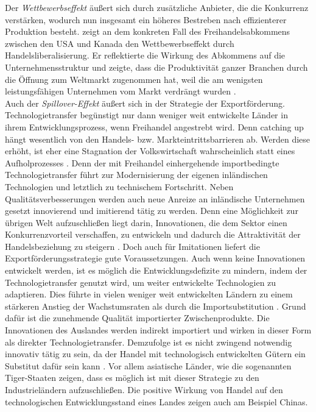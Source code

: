 Der \textit{Wettbewerbseffekt} {\"a}u{\ss}ert sich durch zus{\"a}tzliche Anbieter, die die Konkurrenz verst{\"a}rken, wodurch nun insgesamt ein h{\"o}heres Bestreben nach effizienterer Produktion besteht. \citet{Trefler.2004} zeigt an dem konkreten Fall des Freihandelsabkommens zwischen den USA und Kanada den Wettbewerbseffekt durch Handelsliberalisierung. Er reflektierte die Wirkung des Abkommens auf die Unternehmensstruktur und zeigte, dass die Produktivit{\"a}t ganzer Branchen durch die {\"O}ffnung zum Weltmarkt zugenommen hat, weil die am wenigsten leistungsf{\"a}higen Unternehmen vom Markt verdr{\"a}ngt wurden \cite{Trefler.2004}.\\


Auch der \textit{Spillover-Effekt} {\"a}u{\ss}ert sich in der Strategie der Exportf{\"o}rderung.  Technologietransfer beg{\"u}nstigt nur dann weniger weit entwickelte L{\"a}nder in ihrem Entwicklungsprozess, wenn Freihandel angestrebt wird. Denn catching up h{\"a}ngt wesentlich von den Handels- bzw. Markteintrittsbarrieren ab. Werden diese erh{\"o}ht, ist eher eine Stagnation der Volkswirtschaft wahrscheinlich statt eines Aufholprozesses \cite{Stokey.2015}. Denn der mit Freihandel einhergehende importbedingte Technologietransfer f{\"u}hrt zur Modernisierung der eigenen inl{\"a}ndischen Technologien und letztlich zu technischem Fortschritt.
Neben Qualit{\"a}tsverbesserungen werden auch neue Anreize  an inl{\"a}ndische Unternehmen gesetzt innovierend und imitierend t{\"a}tig zu werden. Denn eine M{\"o}glichkeit zur {\"u}brigen Welt aufzuschlie{\ss}en liegt darin, Innovationen, die dem Sektor einen Konkurrenzvorteil verschaffen, zu entwickeln und dadurch die Attraktivit{\"a}t der Handelsbeziehung zu steigern \citep{Muller.2005}. Doch auch f{\"u}r Imitationen liefert die Exportf{\"o}rderungsstrategie gute Voraussetzungen. Auch wenn keine Innovationen entwickelt werden, ist es m{\"o}glich die Entwicklungsdefizite zu mindern, indem der Technologietransfer genutzt wird, um weiter entwickelte Technologien zu adaptieren.
Dies f{\"u}hrte in vielen weniger weit entwickelten L{\"a}ndern zu einem st{\"a}rkeren Anstieg der Wachstumsraten als durch die Importsubstitution \cite{Krugman.2015}. Grund daf{\"u}r ist die zunehmende Qualit{\"a}t importierter Zwischenprodukte. Die Innovationen des Auslandes werden indirekt importiert und wirken in dieser Form als direkter Technologietransfer. Demzufolge ist es nicht zwingend notwendig innovativ t{\"a}tig zu sein, da der Handel mit technologisch entwickelten G{\"u}tern ein Substitut daf{\"u}r sein kann \citep{Keller.2004}. Vor allem asiatische L{\"a}nder, wie die sogenannten Tiger-Staaten zeigen, dass es m{\"o}glich ist mit dieser Strategie zu den Industriel{\"a}ndern aufzuschlie{\ss}en. Die positive Wirkung von Handel auf den technologischen Entwicklungsstand eines Landes zeigen auch \citet{Bloom.2011} am Beispiel Chinas.\\


